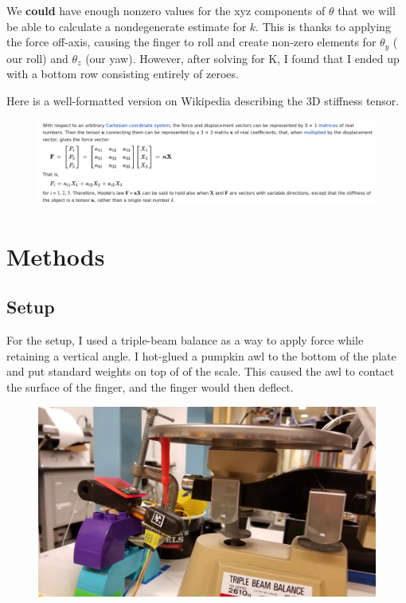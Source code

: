 \documentclass[preprint,12pt,3p]{elsarticle}
\begin{document}
We \textbf{could} have enough nonzero values for the xyz components of $\theta$ that we will be able
to calculate a nondegenerate estimate for $k$. This is thanks to applying the force off-axis,
causing the finger to roll and create non-zero elements for $\theta_y$ ( our roll) and $\theta_z$
(our yaw). However, after solving for K, I found that I ended up with a bottom row consisting
entirely of zeroes.

Here is a well-formatted version on Wikipedia describing the 3D stiffness tensor. 

\begin{figure}[H]
\centering
\includegraphics[width=.9\textwidth]{images/misc/stiffness_tensor.png}
\end{figure}

\section{Methods}

\subsection{Setup}

For the setup, I used a triple-beam balance as a way to apply force while retaining a vertical
angle. I hot-glued a pumpkin awl to the bottom of the plate and put standard weights on top of of
the scale. This caused the awl to contact the surface of the finger, and the finger would then
deflect. 

\begin{figure}[H]
\centering
\includegraphics[width=.3\textheight]{images/setup/closeup.jpg}
\end{figure}
\end{document}
